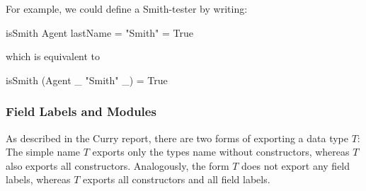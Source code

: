 
\noindent
For example, we could define a Smith-tester by writing:
\begin{curry}
isSmith Agent { lastName = "Smith" } = True
\end{curry}
which is equivalent to
\begin{curry}
isSmith (Agent _ "Smith" _) = True
\end{curry}

\subsubsection{Field Labels and Modules}

As described in the Curry report, there are two forms of
exporting a data type $T$: The simple name $T$ exports only the types name
without constructors, whereas $T$ also exports all
constructors. Analogously, the form $T$ does not export any field labels,
whereas $T$ exports all constructors and all field labels.

